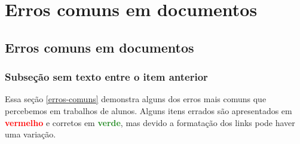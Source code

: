 %
%

\newcommand{\errado}[1]{\textbf{\textcolor{red}{#1}}}
\newcommand{\certo}[1]{\textbf{\textcolor{ForestGreen}{#1}}}
\newcommand{\erradocerto}[3]{\item #1:\begin{itemize}
    \item \errado{#2}
    \item \certo{#3}
\end{itemize}}
\newcommand{\erradoerradocerto}[4]{\item #1:\begin{itemize}
    \item \errado{#2}
    \item \errado{#3}
    \item \certo{#4}
\end{itemize}}



\newcommand{\nomeDoCapitulo}{Erros comuns em documentos}
\chapter{\nomeDoCapitulo}
\label{erros-comuns-capitulo}


\section{\nomeDoCapitulo}
\label{erros-comuns}


\subsection{Subseção sem texto entre o item anterior}
\label{erros-comuns-sub1}


Essa seção \autoref{erros-comuns} demonstra alguns dos erros mais comuns que percebemos em trabalhos de alunos. Alguns itens errados são apresentados em \errado{vermelho} e corretos em \certo{verde}, mas devido a formatação dos links pode haver uma variação.

